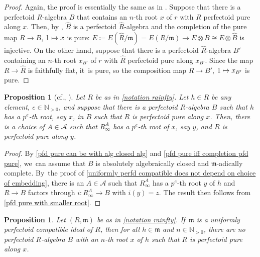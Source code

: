 \documentclass[11pt]{article}
\newcommand{\cf}{cf.\xspace}
\let\autoref\cref
\newcommand\mto{\mathchoice{\longmapsto}{\mapsto}{\mapsto}{\mapsto}}
\theoremstyle{plain}
\newtheorem{proposition}[theorem]{Proposition}
\theoremstyle{definition}
\numberwithin{equation}{theorem}
\let\tensor\otimes
\newcommand{\N}{\mathbb {N}}
\newcommand{\fram}{\mathfrak{m}}
\newcommand{\m}{\mathfrak{m}}
\newcommand{\sA}{\mathcal{A}}
\newcommand{\rafty}{R^A_\infty}
\begin{document}
\begin{proof}
Again, the proof is essentially the same as in \cite[Lem.\,4.8]{BMPSTWWPerfectoidPure}. Suppose that there is a perfectoid $R$\nobreakdash-algebra $B$ that contains an $n$-th root $x$ of $r$ with $R$ perfectoid pure along $x$. Then, by \cite[Prop.\,2.1.11\,(e)]{CesnaviciusScholzePurityFlatCohomology}, $\widehat{B}$ is a perfectoid $\widehat{R}$-algebra and the completion of the pure map $R\to B$, $1\mto x$ is pure: $E\coloneqq E(\widehat{R}/\fram)=E(R/\fram)\to E\tensor B \cong E\tensor \widehat{B}$ is injective. On the other hand, suppose that there is a perfectoid $\widehat{R}$-algebra $B'$ containing an $n$-th root $x_{B'}$ of $r$ with $\widehat{R}$ perfectoid pure along $x_{B'}$. Since the map $R\to \widehat{R}$ is faithfully flat, it~is pure, so the composition map $R\to B'$, $1\mto x_{B'}$ is pure.
\end{proof}

\begin{proposition}[\cf {\cite[Lem.\,4.23]{BMPSTWWPerfectoidPure}}, {\cite[Prop.\,2.9]{YoshikawaComputationMethodPerfectoidPurity}}]\label{pfd pure can take smaller algebra}
Let $R$ be as in \autoref{notation rainfty}. Let $h\in R$ be any element, $e\in \N_{>0}$, and suppose that there is a perfectoid $R$\nobreakdash-algebra $B$ such that $h$ has a $p^e$-th root, say $x$, in $B$ such that $R$ is perfectoid pure along $x$. Then, there is a choice of $A\in \sA$ such that $\rafty$ has a $p^e$-th root of $x$, say $y$, and $R$ is perfectoid pure along $y$.
\end{proposition}

\begin{proof}
By \autoref{pfd pure can be with alg closed alg} and \autoref{pfd pure iff completion pfd pure}, we~can assume that $B$ is absolutely algebraically closed and $\fram$-adically complete. By~the proof of \autoref{uniformly perfd compatible does not depend on choice of embedding}, there is an $A\in \sA$ such that $\rafty$ has a $p^e$-th root $y$ of $h$ and
$R\to B$ factors through $i\colon \rafty\to B$ with $i(y)=z$. The result then follows from \autoref{pfd pure with smaller root}.
\end{proof}

\begin{proposition}\label{max ideal unif compatible implies not pfd pure}
Let $(R,\fram)$ be as in \autoref{notation rainfty}. If~$\m$ is a uniformly perfectoid compatible ideal of $R$, then for all $h\in \fram$ and $n\in \N_{> 0}$, there are no perfectoid $R$\nobreakdash-algebra $B$ with an $n$-th root $x$ of $h$ such that $R$ is perfectoid pure along $x$.
\end{proposition}
\end{document}
